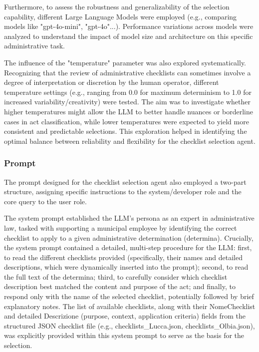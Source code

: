 \documentclass[../main.tex]{subfiles}
\begin{document}
Furthermore, to assess the robustness and generalizability of the selection capability, different Large Language Models were employed (e.g., comparing models like "gpt-4o-mini", "gpt-4o"...). Performance variations across models were analyzed to understand the impact of model size and architecture on this specific administrative task.

The influence of the "temperature" parameter was also explored systematically. Recognizing that the review of administrative checklists can sometimes involve a degree of interpretation or discretion by the human operator, different temperature settings (e.g., ranging from 0.0 for maximum determinism to 1.0 for increased variability/creativity) were tested. The aim was to investigate whether higher temperatures might allow the LLM to better handle nuances or borderline cases in act classification, while lower temperatures were expected to yield more consistent and predictable selections. This exploration helped in identifying the optimal balance between reliability and flexibility for the checklist selection agent.


\subsubsection{Prompt}
The prompt designed for the checklist selection agent also employed a two-part structure, assigning specific instructions to the system/developer role and the core query to the user role. 

The system prompt established the LLM's persona as an expert in administrative law, tasked with supporting a municipal employee by identifying the correct checklist to apply to a given administrative determination (determina). Crucially, the system prompt contained a detailed, multi-step procedure for the LLM: first, to read the different checklists provided (specifically, their names and detailed descriptions, which were dynamically inserted into the prompt); second, to read the full text of the determina; third, to carefully consider which checklist description best matched the content and purpose of the act; and finally, to respond only with the name of the selected checklist, potentially followed by brief explanatory notes. The list of available checklists, along with their NomeChecklist and detailed Descrizione (purpose, context, application criteria) fields from the structured JSON checklist file (e.g., checklists\_Lucca.json, checklists\_Olbia.json), was explicitly provided within this system prompt to serve as the basis for the selection. 
\end{document}

